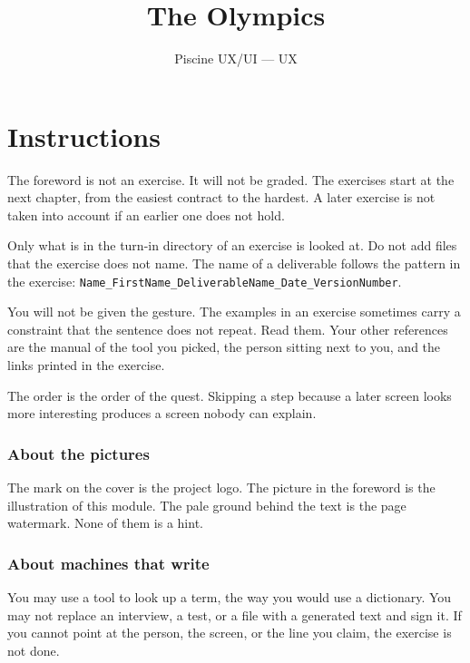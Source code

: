 \documentclass{training}
\begin{document}
\title{The Olympics}
\subtitle{Piscine UX/UI --- UX}
\maketitle

\newpage
\tableofcontents
\newpage


\chapter{Instructions}

The foreword is not an exercise. It will not be graded. The exercises start at the next chapter, from the easiest contract to the hardest. A later exercise is not taken into account if an earlier one does not hold.

Only what is in the turn-in directory of an exercise is looked at. Do not add files that the exercise does not name. The name of a deliverable follows the pattern in the exercise: \texttt{Name\_FirstName\_DeliverableName\_Date\_VersionNumber}.

You will not be given the gesture. The examples in an exercise sometimes carry a constraint that the sentence does not repeat. Read them. Your other references are the manual of the tool you picked, the person sitting next to you, and the links printed in the exercise.

The order is the order of the quest. Skipping a step because a later screen looks more interesting produces a screen nobody can explain.

\subsection*{About the pictures}

The mark on the cover is the project logo. The picture in the foreword is the illustration of this module. The pale ground behind the text is the page watermark. None of them is a hint.

\subsection*{About machines that write}

You may use a tool to look up a term, the way you would use a dictionary. You may not replace an interview, a test, or a file with a generated text and sign it. If you cannot point at the person, the screen, or the line you claim, the exercise is not done.
\end{document}
